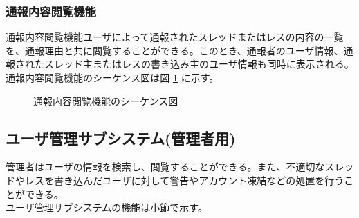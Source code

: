 \documentclass[a4j]{jarticle}
\begin{document}
 \subsubsection{通報内容閲覧機能}
 通報内容閲覧機能ユーザによって通報されたスレッドまたはレスの内容の一覧を、通報理由と共に閲覧することができる。このとき、通報者のユーザ情報、通報されたスレッド主またはレスの書き込み主のユーザ情報も同時に表示される。通報内容閲覧機能のシーケンス図は図 \ref{fig:admin_bbs_report-reading.png} に示す。
              \begin{figure}[H]
\centering
{}
\caption{通報内容閲覧機能のシーケンス図}
\label{fig:admin_bbs_report-reading.png}
\end{figure}

 \subsection{ユーザ管理サブシステム(管理者用)}
 管理者はユーザの情報を検索し、閲覧することができる。また、不適切なスレッドやレスを書き込んだユーザに対して警告やアカウント凍結などの処置を行うことができる。\\
 ユーザ管理サブシステムの機能は小節で示す。
\end{document}
